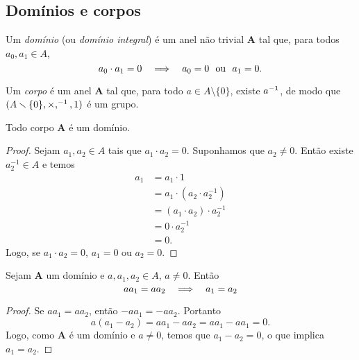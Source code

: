 \subsection{Domínios e corpos}



\begin{definition}
Um \emph{domínio} (ou \emph{domínio integral}) é um anel não trivial $\bm A$ tal que, para todos $a_0,a_1 \in A$,
	\begin{equation*}
	a_0 \cdot a_1 = 0 \quad \Longrightarrow \quad a_0=0 \text{\ \ ou\ \ } a_1=0.
	\end{equation*}
\end{definition}

\begin{definition}
Um \emph{corpo} é um anel $\bm A$ tal que, para todo $a \in A \setminus \{0\}$, existe $a^{-1}$, de modo que $(A \smallsetminus \{0\},\times,^{-1},1)$ é um grupo.
\end{definition}

\begin{proposition}
\label{prop:corp.dom}
Todo corpo $\bm A$ é um domínio.
\end{proposition}
\begin{proof}
	Sejam $a_1,a_2 \in A$ tais que $a_1 \cdot a_2=0$. Suponhamos que $a_2 \neq 0$. Então existe $a_2^{-1} \in A$ e temos
	\begin{equation*}
	\begin{split}
	a_1 &= a_1 \cdot 1 \\
		&= a_1 \cdot (a_2 \cdot a_2^{-1}) \\
		&= (a_1 \cdot a_2) \cdot a_2^{-1}\\
		&= 0 \cdot a_2^{-1} \\
		&= 0.
	\end{split}
	\end{equation*}
	Logo, se $a_1 \cdot a_2=0$, $a_1=0$ ou $a_2=0$.
\end{proof}

\begin{proposition}
Sejam $\bm A$ um domínio e $a,a_1,a_2 \in A$, $a \neq 0$. Então
	\begin{equation*}
	aa_1 = aa_2 \quad \Longrightarrow \quad a_1=a_2
	\end{equation*}
\end{proposition}
\begin{proof}
	Se $aa_1 = aa_2$, então $-aa_1 = -aa_2$. Portanto
	\begin{equation*}
	a(a_1-a_2) = aa_1 -aa_2 = aa_1 -aa_1 = 0.
	\end{equation*}
Logo, como $\bm A$ é um domínio e $a \neq 0$, temos que $a_1-a_2=0$, o que implica $a_1=a_2$.
\end{proof}


